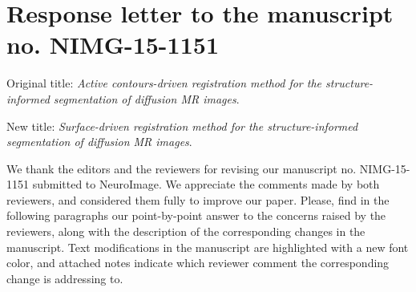 \documentclass[9pt]{memoir}
\begin{document}
\hypersetup{linkcolor=black!60, citecolor=black!60, urlcolor=black!60}

\section*{Response letter to the manuscript no. NIMG-15-1151}
\medskip
Original title: \emph{Active contours-driven registration method for the structure-informed segmentation of
  diffusion MR images}.

\noindent New title: \emph{{\color{blue!70} Surface}-driven registration method for the structure-informed segmentation of
  diffusion MR images}.

\bigskip
\noindent We thank the editors and the reviewers for revising our manuscript no. NIMG-15-1151 submitted to NeuroImage.
We appreciate the comments made by both reviewers, and considered them fully to improve our paper.
Please, find in the following paragraphs our point-by-point answer to the concerns raised by the reviewers,
  along with the description of the corresponding changes in the manuscript.
Text modifications in the manuscript are highlighted with a new font color, and attached notes indicate which reviewer comment
  the corresponding change is addressing to.

\bigskip
\bigskip
\end{document}
